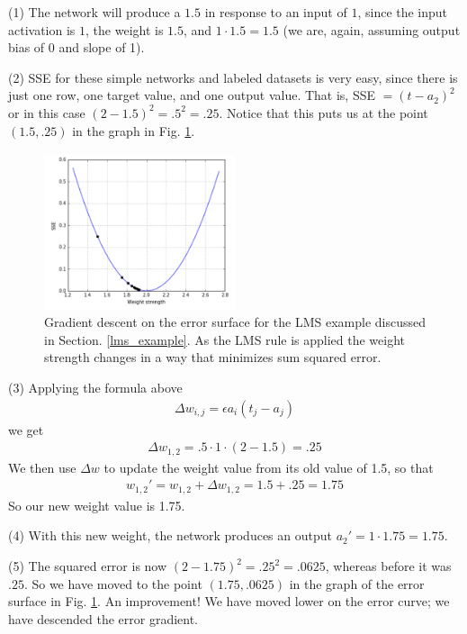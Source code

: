 (1) The network will produce a $1.5$ in response to an input of $1$, since the input activation is $1$, the weight is $1.5$, and $1 \cdot 1.5 = 1.5$ (we are, again, assuming output bias of 0 and slope of 1). 

(2) SSE for these simple networks and labeled datasets is very easy, since there is just one row, one target value, and one output value. That is,  SSE $= (t - a_2)^2$ or in this case $(2-1.5)^2 = .5^2 = .25$. Notice that this puts us at the point $(1.5,.25)$ in the graph in Fig. \ref{error_lms}.

\begin{figure}[h]
\centering
\includegraphics[width=0.5\textwidth]{images/error_lms.png}
\caption[Jeff Yoshimi.]{Gradient descent on the error surface for the LMS example discussed in Section. \ref{lms_example}. As the LMS rule is applied the weight strength changes in a way that minimizes sum squared error.}
\label{error_lms}
\end{figure}

(3) Applying the formula above
\begin{eqnarray*}
\Delta w_{i,j}  =  \epsilon a_i (t_j - a_j)
\end{eqnarray*}
we get
\begin{eqnarray*}
\Delta w_{1,2}  =  .5 \cdot 1 \cdot (2- 1.5) = .25
\end{eqnarray*}
We then use $\Delta w$ to update the weight value from its old value of 1.5, so that
\begin{eqnarray*}
w_{1,2}' = w_{1,2} + \Delta w_{1,2}  = 1.5 +.25  = 1.75
\end{eqnarray*}
So our new weight value is 1.75. 

(4) With this new weight, the network produces an output  $a_2' = 1 \cdot 1.75 = 1.75$. 

(5) The squared error is now $(2-1.75)^2=.25^2=.0625$, whereas before it was $.25$. So we have moved to the point $(1.75,.0625)$ in the graph  of the error surface in Fig. \ref{error_lms}. An improvement!  We have moved lower on the error curve; we have descended the error gradient.

